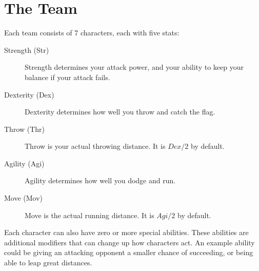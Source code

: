 \section{The Team} \label{the-team}
Each team consists of 7 characters, each with five stats:

\begin{description}
    \item[Strength (Str)] Strength determines your attack power, and your ability to keep your balance if your attack fails.
    \item[Dexterity (Dex)] Dexterity determines how well you throw and catch the flag.
    \item[Throw (Thr)] Throw is your actual throwing distance.
    It is $Dex/2$ by default.
    \item[Agility (Agi)] Agility determines how well you dodge and run.
    \item[Move (Mov)] Move is the actual running distance.
    It is $Agi / 2$ by default.
\end{description}
Each character can also have zero or more special abilities.
These abilities are additional modifiers that can change up how characters act.
An example ability could be giving an attacking opponent a smaller chance of succeeding, or being able to leap great distances.
